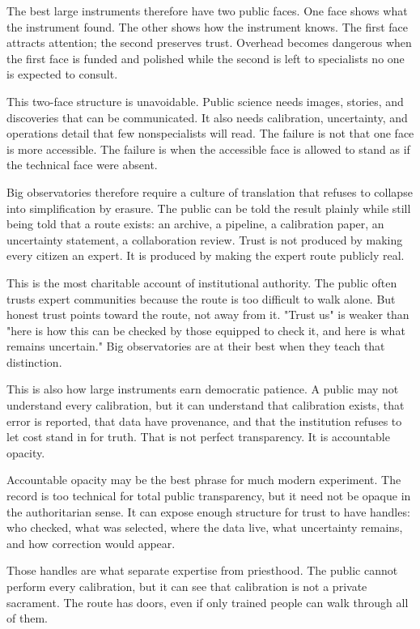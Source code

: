 The best large instruments therefore have two public faces. One face shows
what the instrument found. The other shows how the instrument knows. The first
face attracts attention; the second preserves trust. Overhead becomes
dangerous when the first face is funded and polished while the second is left
to specialists no one is expected to consult.

This two-face structure is unavoidable. Public science needs images, stories,
and discoveries that can be communicated. It also needs calibration,
uncertainty, and operations detail that few nonspecialists will read. The
failure is not that one face is more accessible. The failure is when the
accessible face is allowed to stand as if the technical face were absent.

Big observatories therefore require a culture of translation that refuses to
collapse into simplification by erasure. The public can be told the result plainly
while still being told that a route exists: an archive, a pipeline, a
calibration paper, an uncertainty statement, a collaboration review. Trust is
not produced by making every citizen an expert. It is produced by making the
expert route publicly real.

This is the most charitable account of institutional authority. The public
often trusts expert communities because the route is too difficult to walk
alone. But honest trust points toward the route, not away from it. "Trust
us" is weaker than "here is how this can be checked by those equipped to check
it, and here is what remains uncertain." Big observatories are at their best
when they teach that distinction.

This is also how large instruments earn democratic patience. A public may not
understand every calibration, but it can understand that calibration exists,
that error is reported, that data have provenance, and that the institution
refuses to let cost stand in for truth. That is not perfect transparency. It
is accountable opacity.

Accountable opacity may be the best phrase for much modern experiment. The
record is too technical for total public transparency, but it need not be
opaque in the authoritarian sense. It can expose enough structure for trust to
have handles: who checked, what was selected, where the data live, what
uncertainty remains, and how correction would appear.

Those handles are what separate expertise from priesthood. The public cannot
perform every calibration, but it can see that calibration is not a private
sacrament. The route has doors, even if only trained people can walk through
all of them.

